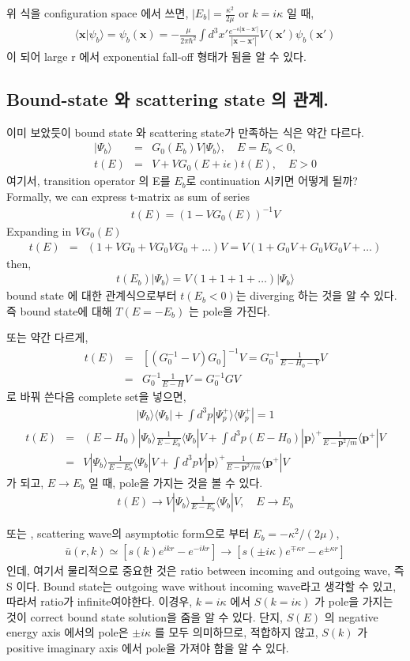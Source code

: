 \documentclass[10pt]{book}
\def\bm{\boldsymbol}
\newcommand{\bea}{\begin{eqnarray}}
\newcommand{\eea}{\end{eqnarray}}
\newcommand{\no}{\nonumber \\}
\def\vp{{\bm p}}
\def\vx{{\bm x}}
\def\la{\langle}
\def\ra{\rangle}
\begin{document}
위 식을 configuration space 에서 쓰면, $|E_b|=\frac{\kappa^2}{2\mu}$ or 
$k=i\kappa $ 일 때, 
\bea
\la \vx|\psi_b\ra=\psi_b(\vx)=-\frac{\mu}{2\pi\hbar^2}\int d^3x'
                  \frac{e^{-\kappa|\vx-\vx'|}}{|\vx-\vx'|}V(\vx')\psi_b(\vx') 
\eea
이 되어 large r 에서 exponential fall-off 형태가 됨을 알 수 있다.

\subsection{Bound-state 와 scattering state 의 관계.}
이미 보았듯이 bound state 와 scattering state가 만족하는 식은 약간 다르다.
\bea
|\Psi_b\ra&=&G_0(E_b)V|\Psi_b\ra, \quad E=E_b<0,\no
t(E)&=&V+V G_0(E+i\epsilon) t(E),\quad E>0
\eea
여기서, transition operator 의 E를 $E_b$로 continuation 시키면 어떻게 될까?
Formally, we can express t-matrix as sum of series
\bea
t(E)=(1-V G_0(E))^{-1} V
\eea
Expanding in $VG_0(E)$
\bea
t(E)&=&(1+VG_0+VG_0VG_0+\dots)V=V(1+G_0V+G_0V G_0V+\dots)
\eea
then,
\bea
t(E_b)|\Psi_b\ra=V(1+1+1+\dots)|\Psi_b\ra
\eea
bound state 에 대한  관계식으로부터 $t(E_b<0)$는 diverging 하는 것을
알 수 있다. 즉 bound state에 대해 $T(E=-E_b)$ 는 pole을 가진다.

또는 약간 다르게,
\bea
t(E)&=&[(G_0^{-1}-V)G_0]^{-1}V=G_0^{-1}\frac{1}{E-H_0-V}V\no 
     &=&G_0^{-1}\frac{1}{E-H}V=G_0^{-1} G V
\eea
로 바꿔 쓴다음 complete set을 넣으면,
\bea
|\Psi_b\ra\la\Psi_b|+\int d^3 p |\Psi_p^{+}\ra\la\Psi_p^{+}|=1 
\eea
\bea
t(E)&=&(E-H_0)|\Psi_b\ra\frac{1}{E-E_b}\la \Psi_b|V
        +\int d^3p (E-H_0)|\vp\ra^+ \frac{1}{E-\vp^2/m}\la \vp^{+}| V \no
      &=&V|\Psi_b\ra\frac{1}{E-E_b}\la\Psi_b|V
         +\int d^3p V|\vp\ra^+ \frac{1}{E-\vp^2/m}\la \vp^{+}| V 
\eea
가 되고, $E\to E_b$ 일 때, pole을 가지는 것을 볼 수 있다.
\bea
t(E)\to V|\Psi_b\ra\frac{1}{E-E_b}\la\Psi_b|V, \quad E\to E_b
\eea

또는 , scattering wave의 asymptotic form으로 부터 $E_b=-\kappa^2/(2\mu)$,
\bea
\bar{u}(r,k)\simeq 
  [s(k) e^{ik r}- e^{-ik r}]
\to [s(\pm i\kappa) e^{\mp \kappa r}- e^{\pm \kappa r}]
\eea
인데, 여기서 물리적으로 중요한 것은 ratio between incoming and outgoing wave, 즉 S 이다. 
Bound state는 outgoing wave without incoming wave라고 생각할 수 있고,
따라서 ratio가 infinite여야한다. 이경우, $k=i\kappa$ 에서 $S(k=i\kappa)$ 
가 pole을 가지는 것이 
correct bound state solution을 줌을 알 수 있다. 단지, $S(E)$ 의 negative 
energy axis 에서의 pole은 $\pm i\kappa$ 를 모두 의미하므로, 적합하지 않고,
$S(k)$ 가 positive imaginary axis 에서 pole을 가져야 함을 알 수 있다.
\end{document}
